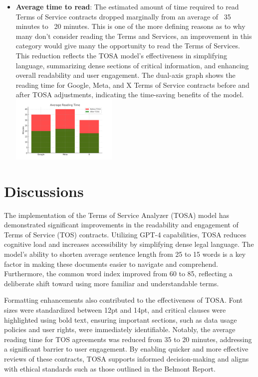 \documentclass[sigconf, nonacm]{acmart}
\begin{document}
\begin{itemize}
\item \textbf{Average time to read}: The estimated amount of time required to read Terms of Service contracts dropped marginally from an average of ~35 minutes to ~20 minutes. This is one of the more defining reasons as to why many don't consider reading the Terms and Services, an improvement in this category would give many the opportunity to read the Terms of Services. This reduction reflects the TOSA model's effectiveness in simplifying language, summarizing dense sections of critical information, and enhancing overall readability and user engagement. The dual-axis graph shows the reading time for Google, Meta, and X Terms of Service contracts before and after TOSA adjustments, indicating the time-saving benefits of the model.
{\center\includegraphics[width=0.4\textwidth]{./resources/reading_time_updated}}
\end{itemize}

\section{Discussions}
The implementation of the Terms of Service Analyzer (TOSA) model has demonstrated significant improvements in the readability and engagement of Terms of Service (TOS) contracts. Utilizing GPT-4 capabilities, TOSA reduces cognitive load and increases accessibility by simplifying dense legal language. The model’s ability to shorten average sentence length from 25 to 15 words is a key factor in making these documents easier to navigate and comprehend. Furthermore, the common word index improved from 60 to 85, reflecting a deliberate shift toward using more familiar and understandable terms.

Formatting enhancements also contributed to the effectiveness of TOSA. Font sizes were standardized between 12pt and 14pt, and critical clauses were highlighted using bold text, ensuring important sections, such as data usage policies and user rights, were immediately identifiable. Notably, the average reading time for TOS agreements was reduced from 35 to 20 minutes, addressing a significant barrier to user engagement. By enabling quicker and more effective reviews of these contracts, TOSA supports informed decision-making and aligns with ethical standards such as those outlined in the Belmont Report.
\end{document}

